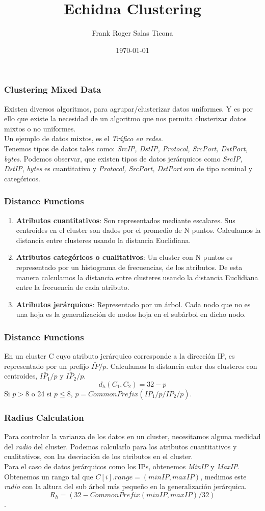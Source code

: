 \documentclass{beamer}
\title{Echidna Clustering}
\author{Frank Roger Salas Ticona}
\date{\today}
\begin{document}
\frame{\titlepage}

\begin{frame}
\frametitle{Clustering Mixed Data}
Existen diversos algoritmos, para agrupar/clusterizar datos uniformes. Y es por ello que existe la necesidad de un algoritmo que nos permita clusterizar datos mixtos o no uniformes.\\
Un ejemplo de datos mixtos, es el \textit{Tráfico en redes}. \\

Tenemos tipos de datos tales como: \textit{SrcIP, DstIP, Protocol, SrcPort, DstPort, bytes}. Podemos observar, que existen tipos de datos jerárquicos como \textit{SrcIP, DstIP}, \textit{bytes} es cuantitativo y \textit{Protocol, SrcPort, DstPort} son de tipo nominal y categóricos.
\end{frame}

\begin{frame}
\frametitle{Distance Functions}
\begin{enumerate}
    \item \textbf{Atributos cuantitativos}:
        Son representados mediante escalares. Sus centroides en el cluster son dados por el promedio de N puntos. Calculamos la distancia entre clusteres usando la distancia Euclidiana.
    \item \textbf{Atributos categóricos o cualitativos}: 
        Un cluster con N puntos es representado por un histograma de frecuencias, de los atributos. De esta manera calculamos la distancia entre clusteres usando la distancia Euclidiana entre la frecuencia de cada atributo.
    \item \textbf{Atributos jerárquicos}: Representado por un árbol. Cada nodo que no es una hoja es la generalización de nodos hoja en el subárbol en dicho nodo.
\end{enumerate}
\end{frame}

\begin{frame}
\frametitle{Distance Functions}
    En un cluster C cuyo atributo jerárquico corresponde a la dirección IP, es representado por un prefijo $\bar{IP}/p$. Calculamos la distancia enter dos clusteres con centroides, $\bar{IP_{1}}/p$ y $\bar{IP_{2}}/p$.
$$d_{h}(C_{1}, C_{2})=32 - p$$
Si $p > 8$ o 24 si $p \leq 8$, $p = CommonPrefix(\bar{IP_{1}}/p / \bar{IP_{2}}/p)$.
\end{frame}

\begin{frame}
\frametitle{Radius Calculation}
Para controlar la varianza de los datos en un cluster, necesitamos alguna medidad del \textit{radio} del cluster. Podemos calcularlo para los atributos cuantitativos y cualitativos, con las desviación de los atributos en el cluster.\\
Para el caso de datos jerárquicos como los IPs, obtenemos \textit{MinIP} y \textit{MaxIP}. Obtenemos un rango tal que $C[i].range=(minIP, maxIP)$, medimos este \textit{radio} con la altura del sub árbol más pequeño en la generalización jerárquica. $$R_{h}=(32-CommonPrefix(minIP, maxIP) / 32)$$.
\end{frame}
\end{document}
